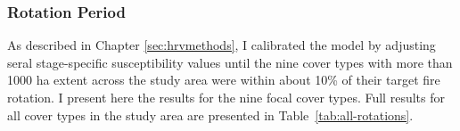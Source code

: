 


\clearpage




\newpage
\subsubsection*{Rotation Period} 
As described in Chapter \ref{sec:hrvmethods}, I calibrated the model by adjusting seral stage-specific susceptibility values until the nine cover types with more than 1000 ha extent across the study area were within about 10\% of their target fire rotation. I present here the results for the nine focal cover types. Full results for all cover types in the study area are presented in Table~\ref{tab:all-rotations}. 

